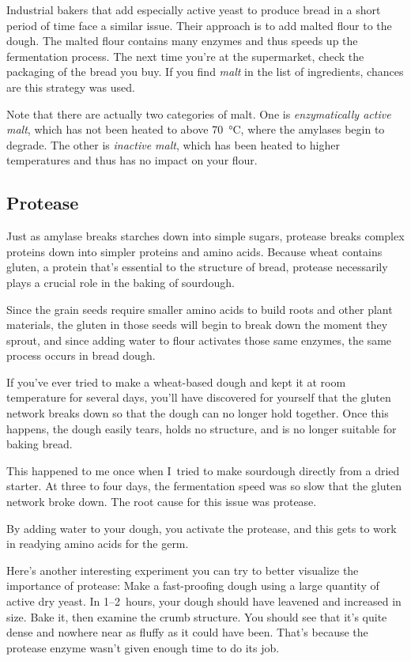Industrial bakers that add especially active yeast to produce bread in a short
period of time face a similar issue. Their approach is to add malted flour to
the dough. The malted flour contains many enzymes and thus speeds up the
fermentation process. The next time you're at the supermarket, check the
packaging of the bread you buy. If you find \emph{malt} in the list of
ingredients, chances are this strategy was used.

Note that there are actually two categories of malt. One is \emph{enzymatically
active malt}, which has not been heated to above  \qty{70}{\degreeCelsius}, where the amylases begin
to degrade. The other is \emph{inactive malt}, which has been heated to higher
temperatures and thus has no impact on your flour.

\subsection{Protease}

Just as amylase breaks starches down into simple sugars, protease breaks
complex proteins down into simpler proteins and amino acids. Because wheat
contains gluten, a protein that's essential to the structure of bread,
protease necessarily plays a crucial role in the baking of sourdough.

Since the grain seeds require smaller amino acids to build roots and other
plant materials, the gluten in those seeds will begin to break down the moment
they sprout, and since adding water to flour activates those same enzymes,
the same process occurs in bread dough.

If you've ever tried to make a wheat-based dough and kept it at room
temperature for several days, you'll have discovered for yourself that the
gluten network breaks down so that the dough can no longer hold together. Once
this happens, the dough easily tears, holds no structure, and is no
longer suitable for baking bread.

This happened to me once when I~tried to make sourdough directly from a dried
starter. At three to four days, the fermentation speed was so slow that the
gluten network broke down. The root cause for this issue was protease.

By adding water to your dough, you activate the protease, and this gets to work
in readying amino acids for the germ.

Here's another interesting experiment you can try to better visualize the
importance of protease: Make a fast-proofing dough using a large quantity
of active dry yeast. In 1--2~hours, your dough should have leavened and
increased in size. Bake it, then examine the crumb structure. You should see
that it's quite dense and nowhere near as fluffy as it could have been. That's
because the protease enzyme wasn't given enough time to do its job.

